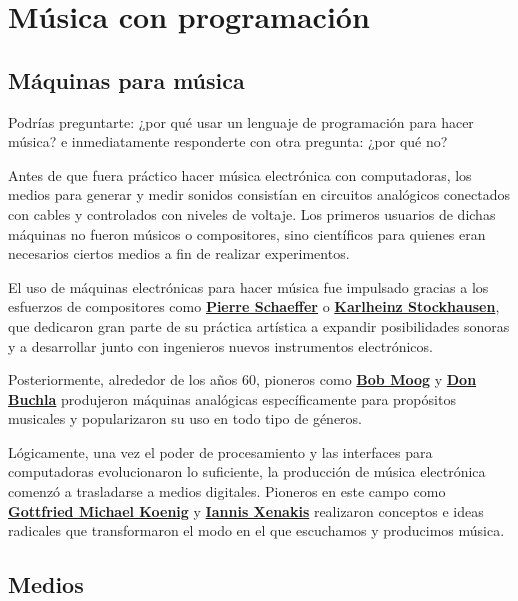 \chapter{Música con programación}

\section{Máquinas para música}

Podrías preguntarte: ¿por qué usar un lenguaje de programación para hacer música? e inmediatamente responderte con otra pregunta: ¿por qué no?

Antes de que fuera práctico hacer música electrónica con computadoras, los medios para generar y medir sonidos consistían en circuitos analógicos conectados con cables y controlados con niveles de voltaje. Los primeros usuarios de dichas máquinas no fueron músicos o compositores, sino científicos para quienes eran necesarios ciertos medios a fin de realizar experimentos. 

El uso de máquinas electrónicas para hacer música fue impulsado gracias a los esfuerzos de compositores como \href{https://es.wikipedia.org/wiki/Pierre_Schaeffer} {\textbf{Pierre Schaeffer}} o \href{https://es.wikipedia.org/wiki/Karlheinz_Stockhausen}{\textbf{Karlheinz Stockhausen}}, que dedicaron gran parte de su práctica artística a expandir posibilidades sonoras y a desarrollar junto con ingenieros nuevos instrumentos electrónicos.   

Posteriormente, alrededor de los años 60, pioneros como \href{https://es.wikipedia.org/wiki/Robert_Moog}{\textbf{Bob Moog}} y \href{https://es.wikipedia.org/wiki/Don_Buchla}{\textbf{Don Buchla}} produjeron máquinas analógicas específicamente para propósitos musicales y popularizaron su uso en todo tipo de géneros. 

Lógicamente, una vez el poder de procesamiento y las interfaces para computadoras evolucionaron lo suficiente, la producción de música electrónica comenzó a trasladarse a medios digitales. Pioneros en este campo como \href{https://es.wikipedia.org/wiki/Gottfried_Michael_Koenig} {\textbf{Gottfried Michael Koenig}} y \href{https://es.wikipedia.org/wiki/Iannis_Xenakis} {\textbf{Iannis Xenakis}} realizaron conceptos e ideas radicales que transformaron el modo en el que escuchamos y producimos música.

\section{Medios}

